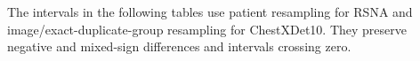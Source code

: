 The intervals in the following tables use patient resampling for RSNA and image/exact-duplicate-group resampling for ChestXDet10. They preserve negative and mixed-sign differences and intervals crossing zero.


% 
% 
% 
